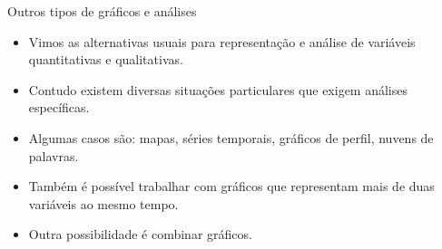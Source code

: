 \documentclass[
  ignorenonframetext,
  serif,
  professionalfont,
  usenames,
  dvipsnames,
  aspectratio = 169]{beamer}
\providecommand{\tightlist}{%
  \setlength{\itemsep}{0pt}\setlength{\parskip}{0pt}}
\renewcommand{\tightlist}{%
  \setlength{\itemsep}{0\baselineskip}
  \setlength{\parskip}{0.25\baselineskip}
}
\def\beginAHalfColumn{\begin{minipage}{0.49\textwidth}}%
\def\endColumns{\end{minipage}}%
\begin{document}
\begin{frame}{Outros tipos de gráficos e análises}
\label{outros-tipos-de-gruxe1ficos-e-anuxe1lises-1}
\beginAHalfColumn

\begin{itemize}
\tightlist
\item
  Vimos as alternativas usuais para representação e análise de variáveis
  quantitativas e qualitativas.
\end{itemize}

\vspace{0.3cm}

\begin{itemize}
\tightlist
\item
  Contudo existem diversas situações particulares que exigem análises
  específicas.
\end{itemize}

\endColumns
\beginAHalfColumn

\begin{itemize}
\tightlist
\item
  Algumas casos são: mapas, séries temporais, gráficos de perfil, nuvens
  de palavras.
\end{itemize}

\vspace{0.3cm}

\begin{itemize}
\tightlist
\item
  Também é possível trabalhar com gráficos que representam mais de duas
  variáveis ao mesmo tempo.
\end{itemize}

\vspace{0.3cm}

\begin{itemize}
\tightlist
\item
  Outra possibilidade é combinar gráficos.
\end{itemize}

\endColumns
\end{frame}
\end{document}
